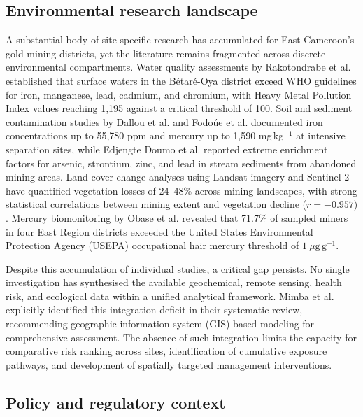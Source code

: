 \documentclass[preprint,12pt,authoryear]{elsarticle}
\begin{document}
\subsection{Environmental research landscape}

A substantial body of site-specific research has accumulated for East Cameroon's gold mining districts, yet the literature remains fragmented across discrete environmental compartments. Water quality assessments by Rakotondrabe et al. \citep{Rakotondrabe2017, Rakotondrabe2018} established that surface waters in the B\'{e}tar\'{e}-Oya district exceed WHO guidelines for iron, manganese, lead, cadmium, and chromium, with Heavy Metal Pollution Index values reaching 1,195 against a critical threshold of 100. Soil and sediment contamination studies by Dallou et al. \citep{Dallou2018} and Fodo\'{u}e et al. \citep{Fodoue2022} documented iron concentrations up to 55,780 ppm and mercury up to 1,590 mg\,kg$^{-1}$ at intensive separation sites, while Edjengte Doumo et al. \citep{Edjengte2023} reported extreme enrichment factors for arsenic, strontium, zinc, and lead in stream sediments from abandoned mining areas. Land cover change analyses using Landsat imagery \citep{Kamga2020} and Sentinel-2 \citep{Azinwi2024, Zoum2025} have quantified vegetation losses of 24--48\% across mining landscapes, with strong statistical correlations between mining extent and vegetation decline ($r = -0.957$) \citep{Zoum2025}. Mercury biomonitoring by Obase et al. \citep{Obase2023} revealed that 71.7\% of sampled miners in four East Region districts exceeded the United States Environmental Protection Agency (USEPA) occupational hair mercury threshold of $1~\mu\text{g}\,\text{g}^{-1}$.

Despite this accumulation of individual studies, a critical gap persists. No single investigation has synthesised the available geochemical, remote sensing, health risk, and ecological data within a unified analytical framework. Mimba et al. \citep{Mimba2023} explicitly identified this integration deficit in their systematic review, recommending geographic information system (GIS)-based modeling for comprehensive assessment. The absence of such integration limits the capacity for comparative risk ranking across sites, identification of cumulative exposure pathways, and development of spatially targeted management interventions.

\subsection{Policy and regulatory context}
\end{document}
